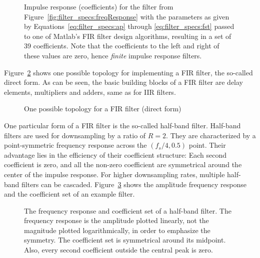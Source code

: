 \begin{figure}
    \centering
    
    \caption[Impulse Response of a FIR Filter]{
        Impulse    response    (coefficients)     for    the    filter    from
        Figure~\ref{fig:filter_specs:freqResponse}    with   the    parameters
        as     given     by     Equations~\ref{eq:filter_specs:ap}     through
        \ref{eq:filter_specs:fst} passed to one  of Matlab's FIR filter design
        algorithms, resulting  in a set  of \num{39} coefficients.   Note that
        the coefficients to the left and right of these values are zero, hence
        \emph{finite} impulse response filters.%
    }
    \label{fig:filter_specs:coefs}
\end{figure}

Figure~\ref{fig:filtertopologies:fir}   shows   one  possible   topology   for
implementing a  FIR filter,  the so-called  direct form. As  can be  seen, the
basic building  blocks of  a FIR  filter are  delay elements,  multipliers and
adders, same as for IIR filters.

\begin{figure}
    \centering
    
    \caption[FIR Filter Topology Example]
        {One possible topology for a FIR filter (direct form)}
    \label{fig:filtertopologies:fir}
\end{figure}

One   particular  form   of  a   FIR   filter  is   the  so-called   half-band
filter. Half-band  filters   are  used   for  downsampling   by  a   ratio  of
$R=2$.   They  are  characterized  by  a  point-symmetric  frequency  response
across  the $(f_s/4,0.5)$  point. Their advantage  lies in  the efficiency  of
their  coefficient structure: Each  second coefficient  is zero,  and all  the
non-zero  coefficient  are  symmetrical  around  the  center  of  the  impulse
response. For  higher  downsampling  rates,  multiple  half-band  filters  can
be cascaded. Figure~\ref{fig:fir:halfband_linear_example}  shows the amplitude
frequency response and the coefficient set of an example filter.

\begin{figure}
    \centering
    
    \caption[Half-band Filter Frequency Response]{%
        The  frequency response  and coefficient  set of  a half-band  filter.
        The  frequency response  is the  amplitude plotted  linearly, not  the
        magnitude plotted logarithmically, in order to emphasize the symmetry.
        The coefficient  set is  symmetrical around its  midpoint. Also, every
        second coefficient outside the central peak is zero.%
    }
    \label{fig:fir:halfband_linear_example}
\end{figure}
%
%
